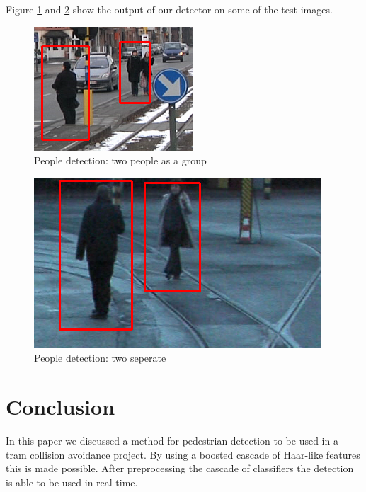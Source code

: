 \documentclass{article}
\begin{document}
Figure \ref{fig:pdetection1} and \ref{fig:pdetection2} show the output of our detector on some of the test images.
\begin{figure}[h!]
	\centering
	\includegraphics[scale=0.60]{peopledetection1.png}
	\caption{People detection: two people as a group}
	\label{fig:pdetection1}
\end{figure}
\begin{figure}[h!]
	\centering
	\includegraphics[scale=0.4]{peopledetection2.png}
	\caption{People detection: two seperate}
	\label{fig:pdetection2}
\end{figure}
\section{Conclusion}
In this paper we discussed a method for pedestrian detection to be used in a tram collision avoidance project. By using a boosted cascade of Haar-like features this is made possible. After preprocessing the cascade of classifiers the detection is able to be used in real time.


\end{document}
